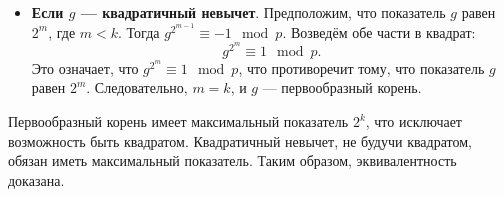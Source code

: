 \documentclass[a4paper]{article}
\begin{document}
\begin{enumerate}
\begin{itemize}
        \item \textbf{Если \( g \) — квадратичный невычет}. 
        Предположим, что показатель \( g \) равен \( 2^m \), 
        где \( m < k \). Тогда \( g^{2^{m - 1}} \equiv -1 \mod p \).
         Возведём обе части в квадрат:
        \[
        g^{2^{m}} \equiv 1 \mod p.
        \]
        Это означает, что \( g^{2^{m}} \equiv 1 \mod p \), 
        что противоречит тому, что показатель \( g \) равен \( 2^m \). 
        Следовательно, \( m = k \), и \( g \) — первообразный корень.
    \end{itemize}
    Первообразный корень имеет максимальный показатель \( 2^k \), что исключает возможность быть квадратом. Квадратичный невычет, не будучи квадратом, обязан иметь максимальный показатель. Таким образом, эквивалентность доказана.


\end{enumerate}
\end{document}
